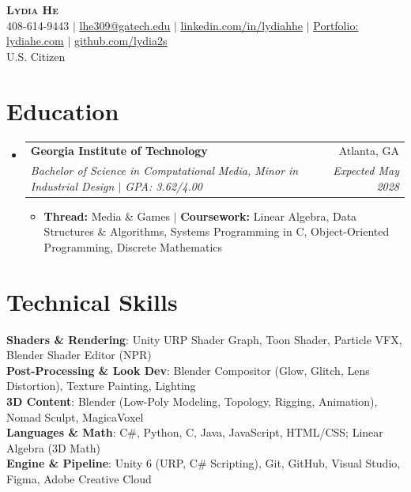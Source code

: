 \documentclass[letterpaper,11pt]{article}
\makeatletter
\newcommand{\resumeItem}[1]{
  \item\small{
    {#1 \vspace{-2pt}}
  }
}
\newcommand{\resumeSubheading}[4]{
  \vspace{-2pt}\item
    \begin{tabular*}{0.97\textwidth}[t]{l@{\extracolsep{\fill}}r}
      \textbf{#1} & #2 \\
      \textit{\small#3} & \textit{\small #4} \\
    \end{tabular*}\vspace{-7pt}
}
\newcommand{\resumeSubHeadingListStart}{\begin{itemize}[leftmargin=0.15in, label={}]}
\newcommand{\resumeSubHeadingListEnd}{\end{itemize}}
\newcommand{\resumeItemListStart}{\begin{itemize}}
\newcommand{\resumeItemListEnd}{\end{itemize}\vspace{-5pt}}
\makeatother
\begin{document}
\begin{center}
    \textbf{\Huge \scshape Lydia He} \\ \vspace{1pt}
    \small 408-614-9443 $|$ \href{mailto:lhe309@gatech.edu}{\underline{lhe309@gatech.edu}} $|$
    \href{https://www.linkedin.com/in/lydiahhe}{\underline{linkedin.com/in/lydiahhe}} $|$
    \href{https://lydiahe.com}{\underline{Portfolio: lydiahe.com}} $|$
    \href{https://github.com/lydia2s}{\underline{github.com/lydia2s}} \\ \vspace{2pt}
    \small U.S. Citizen
\end{center}


\section{Education}
  \resumeSubHeadingListStart
    \resumeSubheading
      {Georgia Institute of Technology}{Atlanta, GA}
      {Bachelor of Science in Computational Media, Minor in Industrial Design $|$ GPA: 3.62/4.00}{Expected May 2028}
      \resumeItemListStart
        \resumeItem{\textbf{Thread:} Media \& Games $|$ \textbf{Coursework:} Linear Algebra, Data Structures \& Algorithms, Systems Programming in C, Object-Oriented Programming, Discrete Mathematics}
      \resumeItemListEnd
  \resumeSubHeadingListEnd


\section{Technical Skills}
 \begin{itemize}[leftmargin=0.15in, label={}]
    \small{\item{
     \textbf{Shaders \& Rendering}{: Unity URP Shader Graph, Toon Shader, Particle VFX, Blender Shader Editor (NPR)} \\
     \textbf{Post-Processing \& Look Dev}{: Blender Compositor (Glow, Glitch, Lens Distortion), Texture Painting, Lighting} \\
     \textbf{3D Content}{: Blender (Low-Poly Modeling, Topology, Rigging, Animation), Nomad Sculpt, MagicaVoxel} \\
     \textbf{Languages \& Math}{: C\#, Python, C, Java, JavaScript, HTML/CSS; Linear Algebra (3D Math)} \\
     \textbf{Engine \& Pipeline}{: Unity 6 (URP, C\# Scripting), Git, GitHub, Visual Studio, Figma, Adobe Creative Cloud}
    }}
 \end{itemize}
\end{document}
